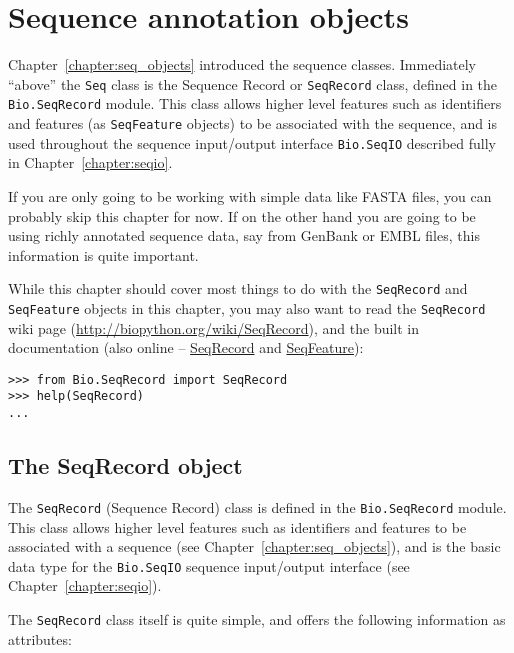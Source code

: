 \chapter{Sequence annotation objects}
\label{chapter:seq_annot}

Chapter~\ref{chapter:seq_objects} introduced the sequence classes.  Immediately ``above'' the \verb|Seq| class is the Sequence Record or \verb|SeqRecord| class, defined in the \verb|Bio.SeqRecord| module. This class allows higher level features such as identifiers and features (as \verb|SeqFeature| objects) to be associated with the sequence, and is used throughout the sequence input/output interface \verb|Bio.SeqIO| described fully in Chapter~\ref{chapter:seqio}.

If you are only going to be working with simple data like FASTA files, you can probably skip this chapter
for now. If on the other hand you are going to be using richly annotated sequence data, say from GenBank
or EMBL files, this information is quite important.

While this chapter should cover most things to do with the \verb|SeqRecord| and \verb|SeqFeature| objects in this chapter, you may also want to read the \verb|SeqRecord| wiki page (\url{http://biopython.org/wiki/SeqRecord}), and the built in documentation (also online -- \href{http://biopython.org/docs/1.77/api/Bio.SeqRecord.html}{SeqRecord} and \href{http://biopython.org/docs/1.77/api/Bio.SeqFeature.html}{SeqFeature}):

\begin{verbatim}
>>> from Bio.SeqRecord import SeqRecord
>>> help(SeqRecord)
...
\end{verbatim}

\section{The SeqRecord object}
\label{sec:SeqRecord}

The \verb|SeqRecord| (Sequence Record) class is defined in the \verb|Bio.SeqRecord| module. This class allows higher level features such as identifiers and features to be associated with a sequence (see Chapter~\ref{chapter:seq_objects}), and is the basic data type for the \verb|Bio.SeqIO| sequence input/output interface (see Chapter~\ref{chapter:seqio}).

The \verb|SeqRecord| class itself is quite simple, and offers the following information as attributes:

